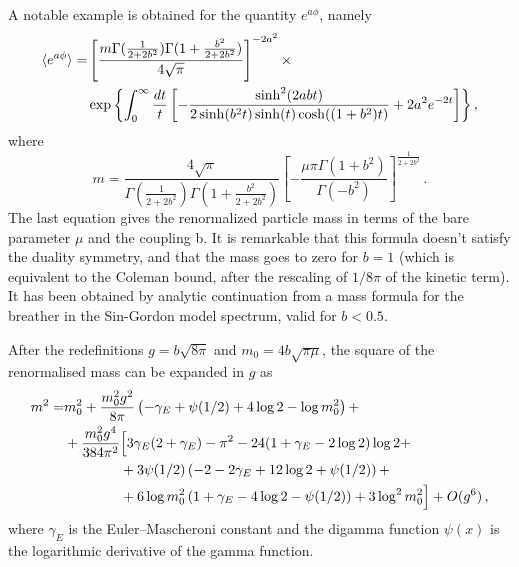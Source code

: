 \documentclass[12pt,a4paper]{report}
\begin{document}
   A notable example is obtained for the quantity $e^{a\phi}$, namely
\begin{align}
\braket{e^{a \phi}} =  &\left[ \dfrac{m\Gamma(\frac{1}{2+2b^2}) \Gamma(1+ \frac{b^2}{2+2b^2}) }{4 \sqrt{\pi}}  \right]^{-2 a^2} \times  \\ & \exp{\left\lbrace \int_0^\infty \dfrac{dt}{t} \left[ - \dfrac{\sinh^2(2 a b t)}{2 \sinh(b^2t) \sinh(t)\cosh((1+b^2)t) } + 2 a^2 e^{-2t} \right]  \right\rbrace } \nonumber \,,
\end{align} where \begin{equation}
\label{eq:mass_continuum}
m = \dfrac{4 \sqrt{\pi}}{\Gamma(\frac{1}{2+2b^2})\Gamma(1 +\frac{b^2}{2+2b^2}) } \left[ - \dfrac{\mu \pi \Gamma(1+b^2)}{\Gamma(-b^2)} \right]^{\frac{1}{2+2b^2}} \,.
\end{equation} The last equation gives the renormalized particle mass in terms of the bare parameter $\mu$ and the coupling b. It is remarkable that this formula doesn't satisfy the duality symmetry, and that the mass goes to zero for $b=1$ (which is equivalent to the Coleman bound, after the rescaling of $1/8\pi$ of the kinetic term). It has been obtained by analytic continuation from a mass formula for the breather in the Sin-Gordon model spectrum, valid for $b<0.5$.

After the redefinitions $g=b\sqrt{8\pi}$ and $m_0=4b\sqrt{\pi\mu}$, the square of the renormalised mass can be expanded in $g$ as
\begin{align}
\label{eq:exactrenormalisedmassexpansion}
m^2=&m_0^2+\frac{m_0^2g^2}{8\pi}\left(
-\gamma_E+\psi(1/2) +4 \log 2-\log m_0^2
\right)+\notag\\
&+\frac{m_0^2g^4}{384\pi^2}\Big[
3\gamma_E(2+\gamma_E)-\pi^2-24(1+\gamma_E-2\log 2)\log 2+\notag\\
&\qquad\qquad+3\psi(1/2)\left(-2-2\gamma_E+12\log 2+\psi(1/2)\right)+\notag\\
&\qquad\qquad+6\log m_0^2\left(1+\gamma_E-4\log 2-\psi(1/2)\right)+3\log^2m_0^2
\Big]+O(g^6)\,,
\end{align}
where $\gamma_E$ is the Euler–Mascheroni constant and the digamma function $\psi(x)$ is the logarithmic derivative of the gamma function.
\end{document}
